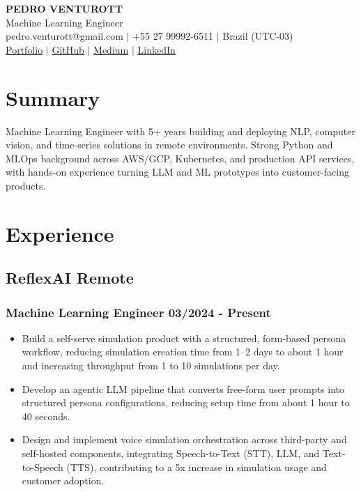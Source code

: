 \documentclass[11pt]{article} %
\begin{document}
\begin{center}
	{\Huge\bfseries PEDRO VENTUROTT} \\ \medskip
	Machine Learning Engineer \\ \medskip
	pedro.venturott@gmail.com $|$ +55 27 99992-6511 $|$ Brazil (UTC-03) \\
	\href{https://pedrohgv.github.io/}{Portfolio} $|$
	\href{https://github.com/Pedrohgv}{GitHub} $|$
	\href{https://pedro-venturott.medium.com/}{Medium} $|$
	\href{https://www.linkedin.com/in/pedro-henrique-gomes-venturott/}{LinkedIn}
\end{center}

\section{Summary}
Machine Learning Engineer with 5+ years building and deploying NLP, computer vision, and time-series solutions in remote environments. Strong Python and MLOps background across AWS/GCP, Kubernetes, and production API services, with hands-on experience turning LLM and ML prototypes into customer-facing products.

\section{Experience}
\subsection{ReflexAI \hfill Remote}
\subsubsection{Machine Learning Engineer \hfill 03/2024 - Present}
\begin{itemize}
	\item Build a self-serve simulation product with a structured, form-based persona workflow, reducing simulation creation time from 1--2 days to about 1 hour and increasing throughput from 1 to 10 simulations per day.
	\item Develop an agentic LLM pipeline that converts free-form user prompts into structured persona configurations, reducing setup time from about 1 hour to 40 seconds.
	\item Design and implement voice simulation orchestration across third-party and self-hosted components, integrating Speech-to-Text (STT), LLM, and Text-to-Speech (TTS), contributing to a 5x increase in simulation usage and customer adoption.
\end{itemize}
\end{document}
